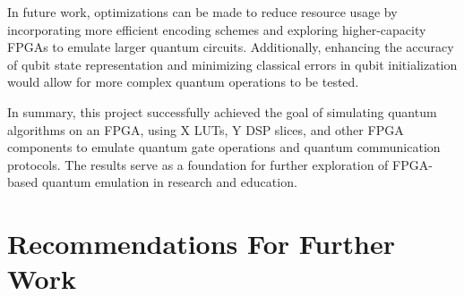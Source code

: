 In future work, optimizations can be made to reduce resource usage by incorporating more efficient encoding schemes and exploring higher-capacity FPGAs to emulate larger quantum circuits. Additionally, enhancing the accuracy of qubit state representation and minimizing classical errors in qubit initialization would allow for more complex quantum operations to be tested.

In summary, this project successfully achieved the goal of simulating quantum algorithms on an FPGA, using X LUTs, Y DSP slices, and other FPGA components to emulate quantum gate operations and quantum communication protocols. The results serve as a foundation for further exploration of FPGA-based quantum emulation in research and education.

\section{Recommendations For Further Work}




